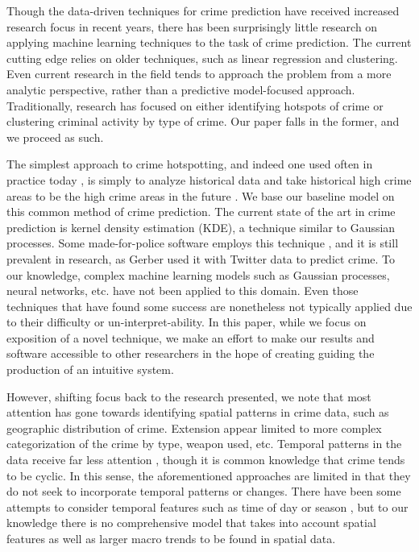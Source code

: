 \documentclass[letterpaper, 11 pt, conference]{ieeeconf}  %
\begin{document}
Though the data-driven techniques for crime prediction have received increased research focus in recent years, there has been surprisingly little research on applying machine learning techniques to the task of crime prediction. The current cutting edge relies on older techniques, such as linear regression and clustering. Even current research in the field tends to approach the problem from a more analytic perspective, rather than a predictive model-focused approach. Traditionally, research has focused on either identifying hotspots of crime or clustering criminal activity by type of crime. Our paper falls in the former, and we proceed as such. 

The simplest approach to crime hotspotting, and indeed one used often in practice today \cite{c8}, is simply to analyze historical data and take historical high crime areas to be the high crime areas in the future \cite{predictive_policing}. We base our baseline model on this common method of crime prediction. The current state of the art in crime prediction is kernel density estimation (KDE), a technique similar to Gaussian processes. Some made-for-police software employs this technique \cite{predictive_policing}, and it is still prevalent in research, as Gerber \cite{c7} used it with Twitter data to predict crime. To our knowledge, complex machine learning models such as Gaussian processes, neural networks, etc. have not been applied to this domain. Even those techniques that have found some success are nonetheless not typically applied due to their difficulty or un-interpret-ability. In this paper, while we focus on exposition of a novel technique, we make an effort to make our results and software accessible to other researchers in the hope of creating guiding the production of an intuitive system.

However, shifting focus back to the research presented, we note that most attention has gone towards identifying spatial patterns in crime data, such as geographic distribution of crime. Extension appear limited to more complex categorization of the crime by type, weapon used, etc. Temporal patterns in the data receive far less attention \cite{hotspot_matrix}, though it is common knowledge that crime tends to be cyclic. In this sense, the aforementioned approaches are limited in that they do not seek to incorporate temporal patterns or changes. There have been some attempts to consider temporal features such as time of day or season \cite{predictive_policing}, but to our knowledge there is no comprehensive model that takes into account spatial features as well as larger macro trends to be found in spatial data.
\end{document}
